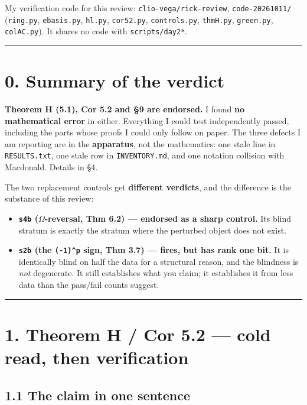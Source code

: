 \documentclass[11pt,a4paper]{article}
\begin{document}
My verification code for this review: \mbox{\texttt{clio-vega/rick-review}}, \mbox{\texttt{code-20261011/}} (\mbox{\texttt{ring.py}}, \mbox{\texttt{ebasis.py}}, \mbox{\texttt{hl.py}}, \mbox{\texttt{cor52.py}}, \mbox{\texttt{controls.py}}, \mbox{\texttt{thmH.py}}, \mbox{\texttt{green.py}}, \mbox{\texttt{colAC.py}}). It shares no code with \mbox{\texttt{scripts/day2*}}.

\medskip\hrule\medskip

\section*{0. Summary of the verdict}

\textbf{Theorem H (5.1), Cor 5.2 and \S{}9 are endorsed.} I found \textbf{no mathematical error} in either. Everything I could test independently passed, including the parts whose proofs I could only follow on paper. The three defects I am reporting are in the \textbf{apparatus}, not the mathematics: one stale line in \mbox{\texttt{RESULTS.txt}}, one stale row in \mbox{\texttt{INVENTORY.md}}, and one notation collision with Macdonald. Details in \S{}4.

The two replacement controls get \textbf{different verdicts}, and the difference is the substance of this review:

\begin{itemize}
\item \textbf{\mbox{\texttt{s4b}} ($\Omega$-reversal, Thm 6.2) --- endorsed as a sharp control.} Its blind stratum is exactly the stratum where the perturbed object does not exist.
\item \textbf{\mbox{\texttt{s2b}} (the \mbox{\texttt{(-1)\textasciicircum{}p}} sign, Thm 3.7) --- fires, but has rank one bit.} It is identically blind on half the data for a structural reason, and the blindness is \emph{not} degenerate. It still establishes what you claim; it establishes it from less data than the pass/fail counts suggest.
\end{itemize}

\medskip\hrule\medskip

\section*{1. Theorem H / Cor 5.2 --- cold read, then verification}

\subsection*{1.1 The claim in one sentence}
\end{document}
